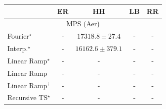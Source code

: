\begin{tabular}{l|cccc|}
\toprule
            & ER & HH & LB & RR \\
\midrule
\multicolumn{5}{c}{\rule{0pt}{8pt}MPS (Aer)} \\
\midrule
Fourier$^\star$ & {\cellcolor[HTML]{000000}} \color[HTML]{F1F1F1} {\cellcolor{white}} \color{black} - & {\cellcolor[HTML]{4D004B}} \color[HTML]{F1F1F1} $17318.8\pm 27.4$ & {\cellcolor[HTML]{000000}} \color[HTML]{F1F1F1} {\cellcolor{white}} \color{black} - & {\cellcolor[HTML]{000000}} \color[HTML]{F1F1F1} {\cellcolor{white}} \color{black} - \\
Interp.$^\star$ & {\cellcolor[HTML]{000000}} \color[HTML]{F1F1F1} {\cellcolor{white}} \color{black} - & {\cellcolor[HTML]{F7FCFD}} \color[HTML]{000000} $16162.6\pm 379.1$ & {\cellcolor[HTML]{000000}} \color[HTML]{F1F1F1} {\cellcolor{white}} \color{black} - & {\cellcolor[HTML]{000000}} \color[HTML]{F1F1F1} {\cellcolor{white}} \color{black} - \\
Linear Ramp$^\star$ & {\cellcolor[HTML]{000000}} \color[HTML]{F1F1F1} {\cellcolor{white}} \color{black} - & {\cellcolor[HTML]{000000}} \color[HTML]{F1F1F1} {\cellcolor{white}} \color{black} - & {\cellcolor[HTML]{000000}} \color[HTML]{F1F1F1} {\cellcolor{white}} \color{black} - & {\cellcolor[HTML]{000000}} \color[HTML]{F1F1F1} {\cellcolor{white}} \color{black} - \\
Linear Ramp & {\cellcolor[HTML]{000000}} \color[HTML]{F1F1F1} {\cellcolor{white}} \color{black} - & {\cellcolor[HTML]{000000}} \color[HTML]{F1F1F1} {\cellcolor{white}} \color{black} - & {\cellcolor[HTML]{000000}} \color[HTML]{F1F1F1} {\cellcolor{white}} \color{black} - & {\cellcolor[HTML]{000000}} \color[HTML]{F1F1F1} {\cellcolor{white}} \color{black} - \\
Linear Ramp$^\dagger$ & {\cellcolor[HTML]{000000}} \color[HTML]{F1F1F1} {\cellcolor{white}} \color{black} - & {\cellcolor[HTML]{000000}} \color[HTML]{F1F1F1} {\cellcolor{white}} \color{black} - & {\cellcolor[HTML]{000000}} \color[HTML]{F1F1F1} {\cellcolor{white}} \color{black} - & {\cellcolor[HTML]{000000}} \color[HTML]{F1F1F1} {\cellcolor{white}} \color{black} - \\
Recursive TS$^\star$ & {\cellcolor[HTML]{000000}} \color[HTML]{F1F1F1} {\cellcolor{white}} \color{black} - & {\cellcolor[HTML]{000000}} \color[HTML]{F1F1F1} {\cellcolor{white}} \color{black} - & {\cellcolor[HTML]{000000}} \color[HTML]{F1F1F1} {\cellcolor{white}} \color{black} - & {\cellcolor[HTML]{000000}} \color[HTML]{F1F1F1} {\cellcolor{white}} \color{black} - \\

\end{tabular}
